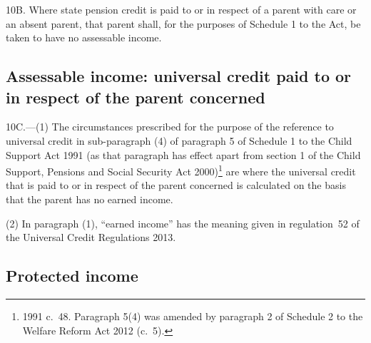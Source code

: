 \documentclass[12pt,a4paper]{article}
\begin{document}
10B.  Where state pension credit is paid to or in respect of a parent with care or an absent parent, that parent shall, for the purposes of Schedule 1 to the Act, be taken to have no assessable income.


\subsection[10C. Assessable income: universal credit paid to or in respect of the parent concerned]{Assessable income: universal credit paid to or in respect of the parent concerned}

10C.—(1) The circumstances prescribed for the purpose of the reference to universal credit in sub-paragraph (4) of paragraph 5 of Schedule 1 to the Child Support Act 1991 (as that paragraph has effect apart from section 1 of the Child Support, Pensions and Social Security Act 2000)\footnote{1991 c.~48. Paragraph 5(4) was amended by paragraph 2 of Schedule 2 to the Welfare Reform Act 2012 (c.~5).} are where the universal credit that is paid to or in respect of the parent concerned is calculated on the basis that the parent has no earned income.

(2) In paragraph (1), “earned income” has the meaning given in regulation~52 of the Universal Credit Regulations 2013.


\subsection[11. Protected income]{Protected income}
\end{document}
